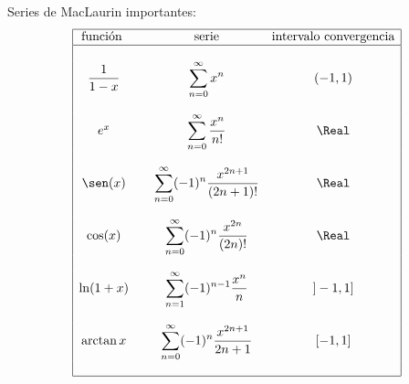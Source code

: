 \documentclass{article}
\begin{document}

{\large Series de MacLaurin importantes:
$$\begin{array}{|cccc|}
  \hline
  \text{función } & & \text{serie} & \text{intervalo convergencia}\\
  \hline
  & & & \\
  \dfrac{1}{1-x} & & \displaystyle\sum_{n=0}^\infty x^n & (-1,1)\\
  & & & \\
  e^x & & \displaystyle\sum_{n=0}^\infty \frac{x^n}{n!} & \Real\\
  & & & \\
  \sen(x) & & \displaystyle\sum_{n=0}^\infty (-1)^n\frac{x^{2n+1}}{(2n+1)!} & \Real\\
  & & & \\
  \cos(x) & & \displaystyle\sum_{n=0}^\infty (-1)^n\frac{x^{2n}}{(2n)!} & \Real\\
  & & & \\
  \ln(1+x) & & \displaystyle\sum_{n=1}^\infty (-1)^{n-1}\frac{x^n}{n} & ]-1,1]\\
  & & & \\
  \arctan x & & \displaystyle\sum_{n=0}^\infty (-1)^n\frac{x^{2n+1}}{2n+1} & [-1,1]\\
  & & & \\
  \hline
\end{array}$$}
\vspace{2mm}
\end{document}
